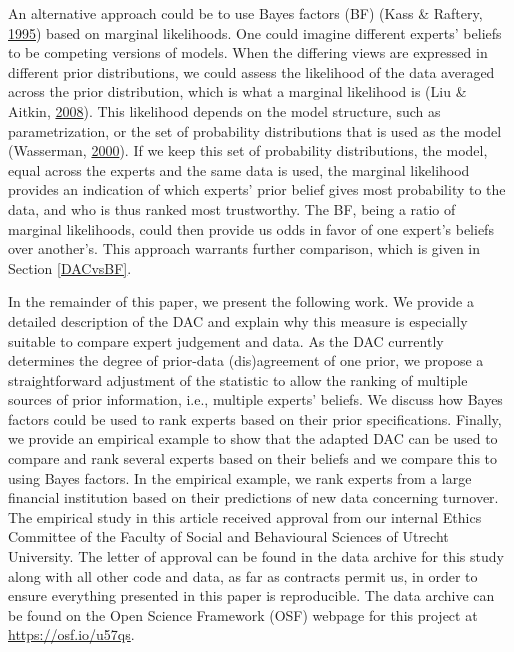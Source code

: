 \documentclass[openright,titlepage,12pt,a4paper]{book}
\begin{document}
An alternative approach could be to use Bayes factors (BF) (Kass \& Raftery, \protect\hyperlink{ref-kass_bayes_1995}{1995}) based on marginal likelihoods. One could imagine different experts' beliefs to be competing versions of models. When the differing views are expressed in different prior distributions, we could assess the likelihood of the data averaged across the prior distribution, which is what a marginal likelihood is (Liu \& Aitkin, \protect\hyperlink{ref-liu_bayes_2008}{2008}). This likelihood depends on the model structure, such as parametrization, or the set of probability distributions that is used as the model (Wasserman, \protect\hyperlink{ref-wasserman_bayesian_2000}{2000}). If we keep this set of probability distributions, the model, equal across the experts and the same data is used, the marginal likelihood provides an indication of which experts' prior belief gives most probability to the data, and who is thus ranked most trustworthy. The BF, being a ratio of marginal likelihoods, could then provide us odds in favor of one expert's beliefs over another's. This approach warrants further comparison, which is given in Section \ref{DACvsBF}.

\newpage

In the remainder of this paper, we present the following work. We provide a detailed description of the DAC and explain why this measure is especially suitable to compare expert judgement and data. As the DAC currently determines the degree of prior-data (dis)agreement of one prior, we propose a straightforward adjustment of the statistic to allow the ranking of multiple sources of prior information, i.e., multiple experts' beliefs. We discuss how Bayes factors could be used to rank experts based on their prior specifications. Finally, we provide an empirical example to show that the adapted DAC can be used to compare and rank several experts based on their beliefs and we compare this to using Bayes factors. In the empirical example, we rank experts from a large financial institution based on their predictions of new data concerning turnover. The empirical study in this article received approval from our internal Ethics Committee of the Faculty of Social and Behavioural Sciences of Utrecht University. The letter of approval can be found in the data archive for this study along with all other code and data, as far as contracts permit us, in order to ensure everything presented in this paper is reproducible. The data archive can be found on the Open Science Framework (OSF) webpage for this project at \url{https://osf.io/u57qs}.
\end{document}

